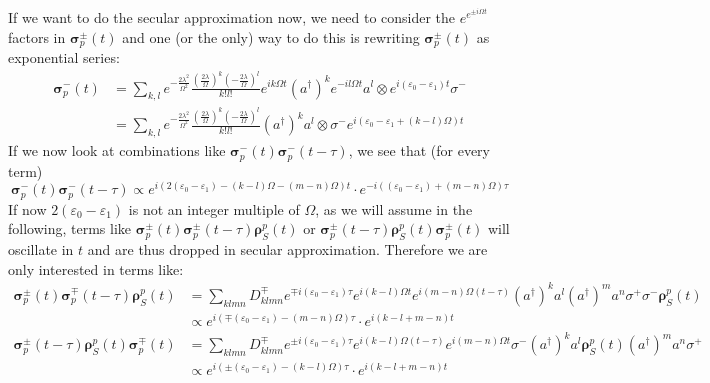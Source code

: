 	If we want to do the secular approximation now, we need to consider the $e^{e^{\pm i \Omega t}}$ factors in  $\boldsymbol{\sigma}_p^\pm(t)$ and one (or the only) way to do this is rewriting $\boldsymbol{\sigma}_p^\pm(t)$ as exponential series:
	\begin{align}
		\boldsymbol{\sigma}_p^-(t) &=	\sum_{k, l}^{}e^{-\frac{2\lambda^2}{\Omega^2}} \frac{\left(\frac{2\lambda}{\Omega}\right)^k \left(-\frac{2\lambda}{\Omega}\right)^l}{k! l!}e^{ik\Omega t} (a^\dagger)^k e^{-il\Omega t} a^l \otimes e^{i(\varepsilon_0 - \varepsilon_1)t} \sigma^- \\
		&= \sum_{k, l}^{}e^{-\frac{2\lambda^2}{\Omega^2}} \frac{\left(\frac{2\lambda}{\Omega}\right)^k \left(-\frac{2\lambda}{\Omega}\right)^l}{k! l!} (a^\dagger)^k a^l \otimes \sigma^-  e^{i(\varepsilon_0 - \varepsilon_1 + (k-l)\Omega )t}
	\end{align}
	If we now look at combinations like $\boldsymbol{\sigma}_p^-(t)\boldsymbol{\sigma}_p^-(t - \tau)$, we see that (for every term)
	\begin{equation}
		\boldsymbol{\sigma}_p^-(t)\boldsymbol{\sigma}_p^-(t- \tau) \propto e^{i (2(\varepsilon_0 - \varepsilon_1) - (k-l) \Omega - (m-n) \Omega) t} \cdot e^{-i ((\varepsilon_0 - \varepsilon_1) + (m-n)\Omega)\tau}
	\end{equation}
	If now $2(\varepsilon_0 - \varepsilon_1)$ is not an integer multiple of $\Omega$, as we will assume in the following,  terms like $\boldsymbol{\sigma}_p^\pm(t)\boldsymbol{\sigma}_p^\pm(t- \tau) \boldsymbol{\rho}_S^p(t)$ or $\boldsymbol{\sigma}_p^\pm(t- \tau)  \boldsymbol{\rho}_S^p(t)\boldsymbol{\sigma}_p^\pm(t)$ will oscillate in $t$ and are thus dropped in secular approximation. Therefore we are only interested in terms like:
	\begin{align*}
		\boldsymbol{\sigma}_p^\pm(t)\boldsymbol{\sigma}_p^\mp(t- \tau) \boldsymbol{\rho}_S^p(t) &=	\sum_{klmn}^{} D_{klmn}^\mp e^{\mp i (\varepsilon_0 - \varepsilon_1) \tau} e^{i (k-l) \Omega t} e^{i (m-n) \Omega (t- \tau)} (a^\dagger)^k a^l (a^\dagger)^m a^n \sigma^+ \sigma^- \boldsymbol{\rho}_S^p(t) \\
		&\propto e^{i (\mp(\varepsilon_0 - \varepsilon_1) - (m-n)\Omega) \tau} \cdot e^{i (k-l +m - n)t}
	\end{align*}
	\begin{align*}
		\boldsymbol{\sigma}_p^\pm(t- \tau) \boldsymbol{\rho}_S^p(t)\boldsymbol{\sigma}_p^\mp(t)  &=	\sum_{klmn}^{} D_{klmn}^\mp e^{\pm i (\varepsilon_0 - \varepsilon_1) \tau} e^{i (k-l) \Omega (t - \tau)} e^{i (m-n) \Omega t} \sigma^- (a^\dagger)^k a^l \boldsymbol{\rho}_S^p(t) (a^\dagger)^m a^n  \sigma^+ \\
		&\propto e^{i (\pm(\varepsilon_0 - \varepsilon_1) - (k-l)\Omega) \tau} \cdot e^{i (k-l +m - n)t}
	\end{align*}
